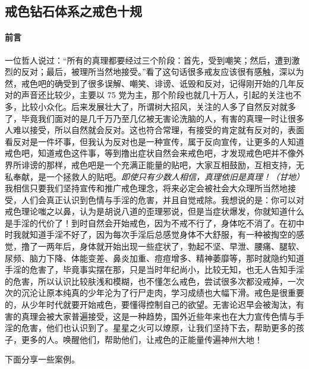 \subsection{戒色钻石体系之戒色十规}\label{126}

\paragraph*{前言}

一位哲人说过：“所有的真理都要经过三个阶段：首先，受到嘲笑；然后，遭到激烈的反对；最后，被理所当然地接受。”看了这句话很多戒友应该很有感触，深以为然，戒色吧的确受到了很多误解、嘲笑、诽谤、诋毁和反对，记得刚开始的几年反对的声音还比较少，主要以 75 党为主，那个阶段也就几十万人，引起的关注也不多，比较小众化。后来发展壮大了，所谓树大招风，关注的人多了自然反对就多了，毕竟我们面对的是几千万乃至几亿被无害论洗脑的人，有害的真理一时让很多人难以接受，所以自然就会反对。这也符合常理，有接受的肯定就有反对的，表面看反对是一件坏事，但我认为反对也是一种宣传，属于反向宣传，让更多的人知道戒色吧，知道戒色这件事，等到撸出症状自然会来戒色吧，才发现戒色吧并不像外界所诽谤的那样，戒色吧是一个充满正能量的贴吧，大家互相鼓励，互相支持，无私奉献，是一个拯救人的贴吧。\textit{即使只有少数人相信，真理依旧是真理！（甘地）} 我相信只要我们坚持宣传和推广戒色理念，将来必定会被社会大众理所当然地接受，人们会真正认识到色情与手淫的危害，并且自觉戒除。我想说的是：你可以对戒色理论嗤之以鼻，认为是胡说八道的歪理邪说，但是当症状爆发，你就知道什么是手淫的代价了！到时自然会开始戒色，因为不戒不行了，身体吃不消了。在初中时我就知道手淫不好了，因为每次手淫后总感觉身体不大舒服，有一种被掏空的感觉，撸了一两年后，身体就开始出现一些症状了，勃起不坚、早泄、腰痛、腿软、尿频、脑力下降、体能变差、鼻炎加重、痘痘增多、精神萎靡等，那时就隐约知道手淫的危害了，毕竟事实摆在那，只是当时年纪尚小，比较无知，也无人告知手淫的危害，所以认识比较肤浅和模糊，也不懂怎么戒色，尝试很多次都没戒掉，一次次的沉沦让原本纯真的少年沦为了行尸走肉，学习成绩也大幅下滑。戒色是很重要的，从少年时代就要开始戒色，要懂得控制自己的欲望。无害论迟早会被淘汰，有害的真理会被大家普遍接受，这是一种趋势，国外近些年来也在大力宣传色情与手淫的危害，他们也认识到了。星星之火可以燎原，让我们坚持下去，帮助更多的孩子，更多的人。唤醒他们，帮助他们，让戒色的正能量传遍神州大地！

下面分享一些案例。

